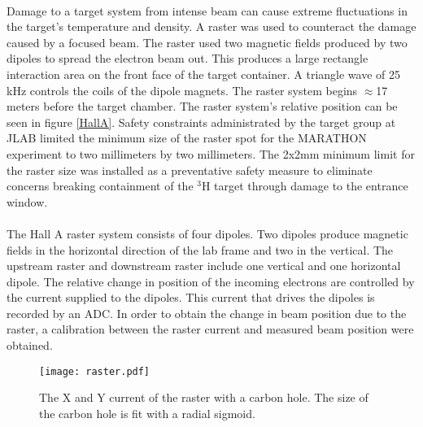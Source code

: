 	 \paragraph{} Damage to a target system from intense beam can cause extreme fluctuations in the target's temperature and density. A raster was used to counteract the damage caused by a focused beam. The raster used two magnetic fields produced by two dipoles to spread the electron beam out. This produces a large rectangle interaction area on the front face of the target container. A triangle wave of 25 kHz controls the coils of the dipole magnets. The raster system begins $\approx$17 meters before the target chamber\cite{BPM2}. The raster system's relative position can be seen in figure \ref{HallA}. Safety constraints administrated by the target group at JLAB limited the minimum size of the raster spot for the MARATHON experiment to two millimeters by two millimeters. The 2x2mm minimum limit for the raster size was installed as a preventative safety measure to eliminate concerns breaking containment of the $^3$H target through damage to the entrance window. 
	 \paragraph{} The Hall A raster system consists of four dipoles. Two dipoles produce magnetic fields in the horizontal direction of the lab frame and two in the vertical. The upstream raster and downstream raster include one vertical and one horizontal dipole. The relative change in position of the incoming electrons are controlled by the current supplied to the dipoles. This current that drives the dipoles is recorded by an ADC. In order to obtain the change in beam position due to the raster, a calibration between the raster current and measured beam position were obtained.  
	  \begin{figure}[th!]
	 	\centering
	  	\texttt{[image: raster.pdf]} 
	 	\caption{The X and Y current of the raster with a carbon hole. The size of the carbon hole is fit with a radial sigmoid\cite{Trast}.}
	 	\label{fig:raster}
	 \end{figure} 
